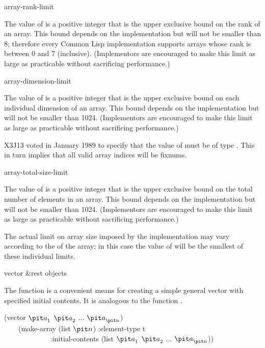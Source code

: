 \begin{defun}[Constant]
array-rank-limit

The value of  is a positive integer that is
the upper exclusive bound on the rank of an array.
This bound depends on the implementation
but will not be smaller than 8; therefore every Common Lisp implementation
supports arrays whose rank is between 0 and 7 (inclusive).
(Implementors are encouraged to make this limit as large as practicable
without sacrificing performance.)
\end{defun}

\begin{defun}[Constant]
array-dimension-limit

The value of  is a positive integer that is
the upper exclusive bound on each individual dimension of an array.
This bound depends on the implementation
but will not be smaller than 1024.
(Implementors are encouraged to make this limit as large as practicable
without sacrificing performance.)

\begin{new}
X3J13 voted in January 1989
to specify that the value
of  must be of type .
This in turn implies that all valid array indices will be fixnums.
\end{new}

\end{defun}

\begin{defun}[Constant]
array-total-size-limit

The value of  is a positive integer that is
the upper exclusive bound on the total number of elements in an array.
This bound depends on the implementation
but will not be smaller than 1024.
(Implementors are encouraged to make this limit as large as practicable
without sacrificing performance.)

The actual limit on array size imposed by the implementation may vary
according to the  of the array; in this case the value of
 will be the smallest of these individual
limits.
\end{defun}

\begin{defun}[Function]
vector &rest objects

The function  is a convenient means for creating
a simple general vector with specified initial contents.
It is analogous to the function .
\begin{lisp}
(vector ${\it a}_1$ ${\it a}_2$ ... ${\it a}_{\hbox{\scriptsize\it n}}$) \\
~~~\EQ\ (make-array (list ${\it n}$) :element-type t \\
~~~~~~~~~~~~~:initial-contents (list ${\it a}_1$ ${\it a}_2$ ... ${\it a}_{\hbox{\scriptsize\it n}}$))
\end{lisp}
\end{defun}

